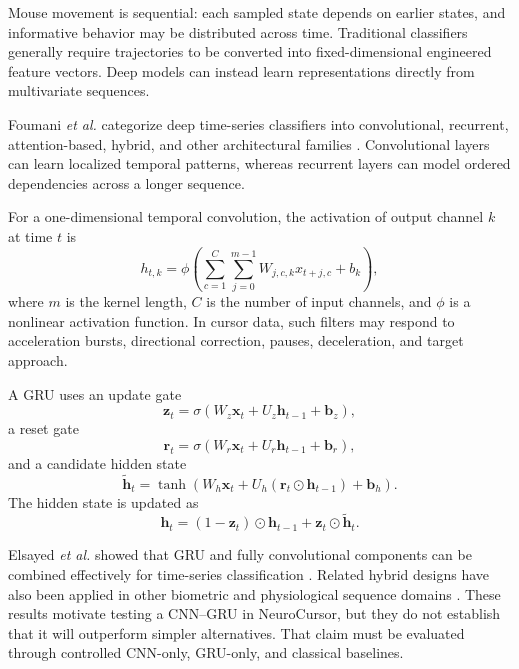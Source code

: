 \documentclass[conference]{IEEEtran}
\begin{document}
Mouse movement is sequential: each sampled state depends on earlier states,
and informative behavior may be distributed across time. Traditional
classifiers generally require trajectories to be converted into
fixed-dimensional engineered feature vectors. Deep models can instead learn
representations directly from multivariate sequences.

Foumani \textit{et al.} categorize deep time-series classifiers into
convolutional, recurrent, attention-based, hybrid, and other architectural
families \cite{foumaniTimeSeriesSurvey}. Convolutional layers can learn
localized temporal patterns, whereas recurrent layers can model ordered
dependencies across a longer sequence.

For a one-dimensional temporal convolution, the activation of output channel
$k$ at time $t$ is
\begin{equation}
h_{t,k}
=
\phi
\left(
\sum_{c=1}^{C}
\sum_{j=0}^{m-1}
W_{j,c,k}x_{t+j,c}
+
b_k
\right),
\label{eq:temporal_convolution}
\end{equation}
where $m$ is the kernel length, $C$ is the number of input channels, and
$\phi$ is a nonlinear activation function. In cursor data, such filters may
respond to acceleration bursts, directional correction, pauses,
deceleration, and target approach.

A GRU uses an update gate
\begin{equation}
\mathbf{z}_t
=
\sigma
\left(
W_z\mathbf{x}_t
+
U_z\mathbf{h}_{t-1}
+
\mathbf{b}_z
\right),
\end{equation}
a reset gate
\begin{equation}
\mathbf{r}_t
=
\sigma
\left(
W_r\mathbf{x}_t
+
U_r\mathbf{h}_{t-1}
+
\mathbf{b}_r
\right),
\end{equation}
and a candidate hidden state
\begin{equation}
\widetilde{\mathbf{h}}_t
=
\tanh
\left(
W_h\mathbf{x}_t
+
U_h
\left(
\mathbf{r}_t\odot\mathbf{h}_{t-1}
\right)
+
\mathbf{b}_h
\right).
\end{equation}
The hidden state is updated as
\begin{equation}
\mathbf{h}_t
=
(1-\mathbf{z}_t)\odot\mathbf{h}_{t-1}
+
\mathbf{z}_t\odot\widetilde{\mathbf{h}}_t.
\label{eq:gru_hidden_state}
\end{equation}

Elsayed \textit{et al.} showed that GRU and fully convolutional components
can be combined effectively for time-series classification
\cite{elsayedGRUFCN}. Related hybrid designs have also been applied in other
biometric and physiological sequence domains \cite{bangCNNGRU}. These
results motivate testing a CNN--GRU in NeuroCursor, but they do not establish
that it will outperform simpler alternatives. That claim must be evaluated
through controlled CNN-only, GRU-only, and classical baselines.
\end{document}
